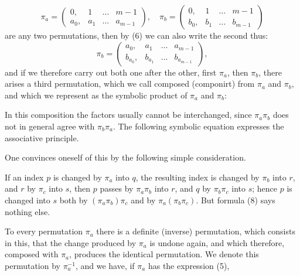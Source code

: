 
\[
\pi_a = \begin{pmatrix} 0, & 1 & \ldots & m-1 \\ a_0, & a_1 & \ldots & a_{m-1} \end{pmatrix}, \quad
\pi_b = \begin{pmatrix} 0, & 1 & \ldots & m-1 \\ b_0, & b_1 & \ldots & b_{m-1} \end{pmatrix}
\]
are any two permutations, then by (6) we can also write the second
thus:
\[
\pi_b = \begin{pmatrix} a_0, & a_1 & \ldots & a_{m-1} \\ b_{a_0}, & b_{a_1} & \ldots & b_{a_{m-1}} \end{pmatrix},
\]
and if we therefore carry out both one after the other, first $\pi_a$,
then $\pi_b$, there arises a third permutation, which we call composed
(componirt) from $\pi_a$ and $\pi_b$, and which we represent as the
symbolic product of $\pi_a$ and $\pi_b$:


In this composition the factors usually cannot be interchanged,
since $\pi_a \pi_b$ does not in general agree with
$\pi_b \pi_a$. The following symbolic equation expresses the associative
principle.


One convinces oneself of this by the following simple
consideration.

If an index $p$ is changed by $\pi_a$ into $q$, the resulting index is changed
by $\pi_b$ into $r$, and $r$ by $\pi_c$ into $s$, then $p$ passes by
$\pi_a \pi_b$ into $r$, and $q$ by $\pi_b \pi_c$ into $s$; hence
$p$ is changed into $s$ both by $(\pi_a \pi_b)\pi_c$ and by
$\pi_a(\pi_b \pi_c)$. But formula (8) says nothing else.

To every permutation $\pi_a$ there is a definite
 (inverse) permutation, which consists in this,
that the change produced by $\pi_a$ is undone again, and which
therefore, composed with $\pi_a$, produces the identical
permutation. We denote this permutation by
$\pi_a^{-1}$, and we have, if $\pi_a$ has the expression (5),

